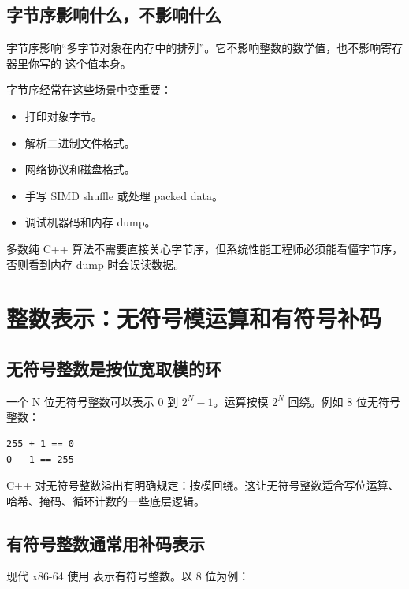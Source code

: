 \subsection{字节序影响什么，不影响什么}

字节序影响“多字节对象在内存中的排列”。它不影响整数的数学值，也不影响寄存器里你写的  这个值本身。

字节序经常在这些场景中变重要：

\begin{itemize}
  \item 打印对象字节。
  \item 解析二进制文件格式。
  \item 网络协议和磁盘格式。
  \item 手写 SIMD shuffle 或处理 packed data。
  \item 调试机器码和内存 dump。
\end{itemize}

多数纯 C++ 算法不需要直接关心字节序，但系统性能工程师必须能看懂字节序，否则看到内存 dump 时会误读数据。

\section{整数表示：无符号模运算和有符号补码}

\subsection{无符号整数是按位宽取模的环}

一个 N 位无符号整数可以表示 $0$ 到 $2^N - 1$。运算按模 $2^N$ 回绕。例如 8 位无符号整数：

\begin{center}
\begin{minipage}{0.6\linewidth}
\begin{verbatim}
255 + 1 == 0
0 - 1 == 255
\end{verbatim}
\end{minipage}
\end{center}

C++ 对无符号整数溢出有明确规定：按模回绕。这让无符号整数适合写位运算、哈希、掩码、循环计数的一些底层逻辑。

\subsection{有符号整数通常用补码表示}

现代 x86-64 使用  表示有符号整数。以 8 位为例：

